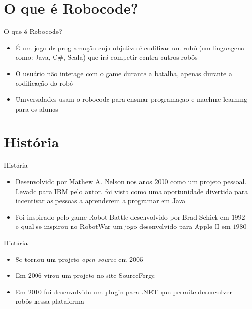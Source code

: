 \section{O que é Robocode?}

\begin{frame}
	\begin{block}{O que é Robocode?}
		\begin{itemize}
			\item É um jogo de programação cujo objetivo é codificar um robô (em linguagens como: Java, C\#, Scala) que irá competir contra outros robôs

			\item O usuário não interage com o game durante a batalha, apenas durante a codificação do robô
			
			\item Universidades usam o robocode para ensinar programação e machine learning para os alunos \citep{ROBOWIKI}
			
		\end{itemize}
	\end{block}
\end{frame}


\section{História}

\begin{frame}
	\begin{block}{História}
		\begin{itemize}
			\item Desenvolvido por Mathew A. Nelson nos anos $2000$ como um projeto pessoal. Levado para IBM pelo autor, foi visto como uma oportunidade divertida para incentivar as pessoas a aprenderem a programar em Java

			\item Foi inspirado pelo game Robot Battle desenvolvido por Brad Schick em $1992$ o qual se inspirou no RobotWar um jogo desenvolvido para Apple II em $1980$
			
		\end{itemize}
	\end{block}
\end{frame}


\begin{frame}
	\begin{block}{História}
		\begin{itemize}
		
			\item Se tornou um projeto \emph{open source} em $2005$
			
			\item Em $2006$ virou um projeto no site SourceForge

			\item Em $2010$ foi desenvolvido um plugin para .NET que permite desenvolver robôs nessa plataforma \citep{readmeRobo}
						
		\end{itemize}
	\end{block}
\end{frame}

